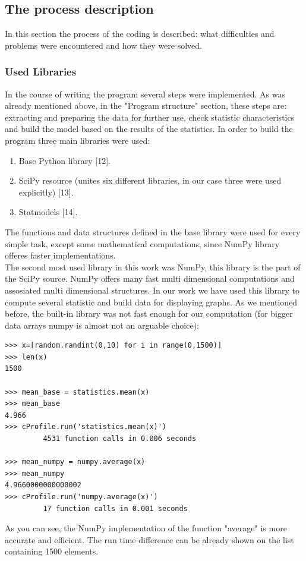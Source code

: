 \documentclass{article}
\begin{document}
\subsection{The process description}
In this section the process of the coding is described: what difficulties and problems were encountered and how they were solved.
\subsubsection{Used Libraries}
In the course of writing the program several steps were implemented. As was already mentioned above, in the "Program structure" section, these steps are: extracting and preparing the data for further use, check statistic characteristics and build the model based on the results of the statistics. In order to build the program three main libraries were used:
\begin{enumerate}
    \item Base Python library [12].
    \item SciPy resource (unites six different libraries, in our case three were used explicitly) [13].
    \item Statmodels [14].
\end{enumerate}
The functions and data structures defined in the base library were used for every simple task, except some mathematical computations, since NumPy library offeres faster implementations.\\
The second most used library in this work was NumPy, this library is the part of the SciPy source. NumPy offers many fast multi dimensional computations and assosiated multi dimensional structures. In our work we have used this library to compute several statistic and build data for displaying graphs. As we mentioned before, the built-in library was not fast enough for our computation (for bigger data arrays numpy is almost not an arguable choice):
\begin{verbatim}
>>> x=[random.randint(0,10) for i in range(0,1500)]
>>> len(x)
1500

>>> mean_base = statistics.mean(x)
>>> mean_base
4.966
>>> cProfile.run('statistics.mean(x)')   
         4531 function calls in 0.006 seconds
        
>>> mean_numpy = numpy.average(x)
>>> mean_numpy
4.9660000000000002
>>> cProfile.run('numpy.average(x)')
         17 function calls in 0.001 seconds
\end{verbatim}   
As you can see, the NumPy implementation of the function "average" is more accurate and efficient. The run time difference can be already shown on the list containing 1500 elements.\\
\end{document}
